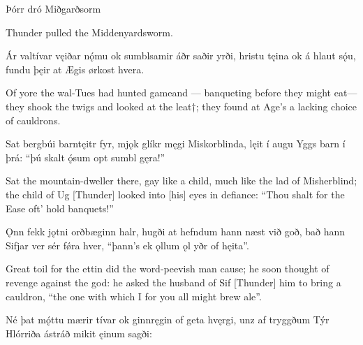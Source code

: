 Þórr dró Miðgarðsorm

Thunder pulled the Middenyardsworm.

Ár valtívar \hld vęiðar nǫ́mu
ok sumblsamir \hld áðr saðir yrði,
hristu tęina \hld ok á hlaut sǫ́u,
fundu þęir at Ægis \hld ørkost hvera.

Of yore the wal-Tues had hunted game\footnotemark[1] and — banqueting before they might eat\footnotemark[1] — they shook the twigs and looked at the leat†; they found at Age’s a lacking choice of cauldrons.

Sat bergbúi \hld barntęitr fyr,
mjǫk glíkr męgi \hld Miskorblinda,
lęit í augu \hld Yggs barn í þrá:
“þú skalt ǫ́sum \hld opt sumbl gęra!”

Sat the mountain-dweller there, gay like a child, much like the lad of Misherblind; the child of Ug [Thunder] looked into [his] eyes in defiance: “Thou shalt for the Ease oft’ hold banquets!”

Ǫnn fekk jǫtni \hld orðbæginn halr,
hugði at hefndum \hld hann næst við goð,
bað hann Sifjar ver \hld sér fǿra hver,
“þann’s ek ǫllum ǫl \hld yðr of hęita”.

Great toil for the ettin did the word-peevish man cause; he soon thought of revenge against the god: he asked the husband of Sif [Thunder] him to bring a cauldron, “the one with which I for you all might brew ale”.

Né þat mǫ́ttu \hld mærir tívar
ok ginnręgin \hld of geta hvęrgi,
unz af tryggðum \hld Týr Hlórriða
ástráð mikit \hld ęinum sagði: 
